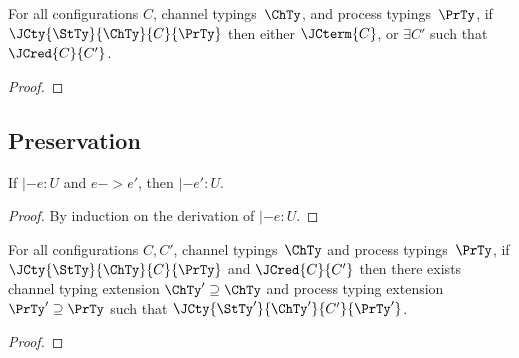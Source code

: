 \begin{theorem}[Progress]
  For all configurations $C$, channel typings~$\ChTy$,
  and process typings~$\PrTy$, if $\JCty{\StTy}{\ChTy}{C}{\PrTy}$ then
  either $\JCterm{C}$, or $\exists C'$ such that $\JCred{C}{C'}$.
  \begin{proof}
    \todo{}
  \end{proof}
\end{theorem}

\subsection{Preservation}

\begin{theorem}
  If $|- e : U$ and $e -> e'$, then $|- e' : U$.
  \begin{proof}
    By induction on the derivation of $|- e : U$.
  \end{proof}
\end{theorem}

\begin{theorem}[Preservation]
  For all configurations $C, C'$, channel typings~$\ChTy$ and process
  typings~$\PrTy$, if $\JCty{\StTy}{\ChTy}{C}{\PrTy}$ and $\JCred{C}{C'}$ then
  there exists channel typing extension $\ChTy' \supseteq \ChTy$ and process typing
  extension $\PrTy' \supseteq \PrTy$ such that $\JCty{\StTy'}{\ChTy'}{C'}{\PrTy'}$.
  \begin{proof}
    \todo{}
  \end{proof}
\end{theorem}

\newpage

